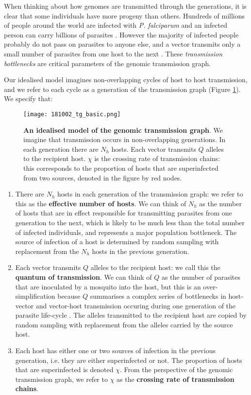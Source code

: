\documentclass[_main.tex]{subfiles}
\begin{document}
When thinking about how genomes are transmitted through the generations, it is clear that some individuals have more progeny than others.  Hundreds of millions of people around the world are infected with \textit{P. falciparum} and an infected person can carry billions of parasites \cite{WHO2022}.  However the majority of infected people probably do not pass on parasites to anyone else, and a vector transmits only a small number of parasites from one host to the next \cite{Graumans2020}.  These \textit{transmission bottlenecks} are critical parameters of the genomic transmission graph.

Our idealised model imagines non-overlapping cycles of host to host transmission, and we refer to each cycle as a generation of the transmission graph (Figure \ref{fig:graph_2}).  We specify that: 

\begin{figure}[h!]
\centering
\texttt{[image: 181002\_tg\_basic.png]}
\caption{\textbf{An idealised model of the genomic transmission graph}.  We imagine that transmission occurs in non-overlapping generations.  In each generation there are $N_h$ hosts.  Each vector transmits $Q$ alleles to the recipient host.  $\chi$ is the crossing rate of transmission chains: this corresponds to the proportion of hosts that are superinfected from two sources, denoted in the figure by red nodes.}
\label{fig:graph_2}
\end{figure}

\begin{enumerate}

\item  There are $N_h$ hosts in each generation of the transmission graph: we refer to this as the \textbf{effective number of hosts}.  We can think of $N_h$ as the number of hosts that are in effect responsible for transmitting parasites from one generation to the next, which is likely to be much less than the total number of infected individuals, and represents a major population bottleneck.  The source of infection of a host is determined by random sampling with replacement from the $N_h$ hosts in the previous generation.

\item Each vector transmits $Q$ alleles to the recipient host: we call this the \textbf{quantum of transmission}.  We can think of $Q$ as the number of parasites that are inoculated by a mosquito into the host, but this is an over-simplification because $Q$ summarises a complex series of bottlenecks in host-vector and vector-host transmission occuring during one generation of the parasite life-cycle \cite{Chan2013,Graumans2020}.  The alleles transmitted to the recipient host are copied by random sampling with replacement from the alleles carried by the source host.

\item Each host has either one or two sources of infection in the previous generation, i.e. they are either superinfected or not.  The proportion of hosts that are superinfected is denoted $\chi$.  From the perspective of the genomic transmission graph, we refer to $\chi$ as the \textbf{crossing rate of transmission chains}. 

\end{enumerate}
\end{document}
